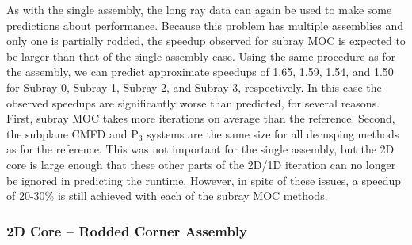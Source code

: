 As with the single assembly, the long ray data can again be used to make some predictions about performance.  Because this problem has multiple assemblies and only one is partially rodded, the speedup observed for subray MOC is expected to be larger than that of the single assembly case.  Using the same procedure as for the assembly, we can predict approximate speedups of 1.65, 1.59, 1.54, and 1.50 for Subray-0, Subray-1, Subray-2, and Subray-3, respectively.  In this case the observed speedups are significantly worse than predicted, for several reasons.  First, subray MOC takes more iterations on average than the reference.  Second, the subplane CMFD and P$_3$ systems are the same size for all decusping methods as for the reference.  This was not important for the single assembly, but the 2D core is large enough that these other parts of the 2D/1D iteration can no longer be ignored in predicting the runtime.  However, in spite of these issues, a speedup of 20-30\% is still achieved with each of the subray MOC methods.

\subsubsection{2D Core -- Rodded Corner Assembly}

